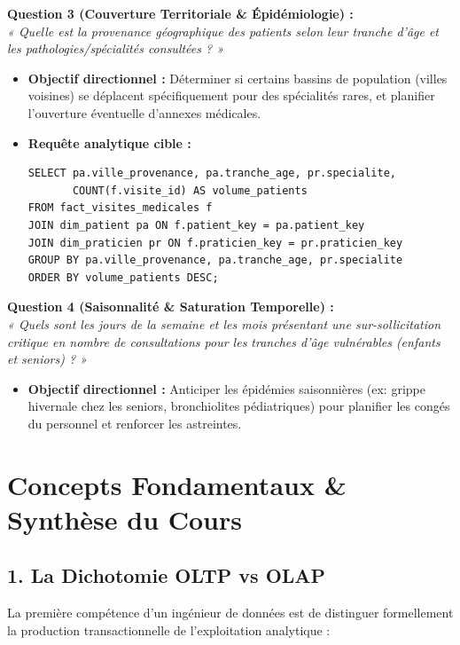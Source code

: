 \documentclass[11pt, a4paper]{article}
\begin{document}
\vspace{0.2cm}
\noindent\textbf{Question 3 (Couverture Territoriale \& Épidémiologie) :} \\
\textit{« Quelle est la provenance géographique des patients selon leur tranche d'âge et les pathologies/spécialités consultées ? »}
\begin{itemize}[label=$\rightarrow$]
    \item \textbf{Objectif directionnel :} Déterminer si certains bassins de population (villes voisines) se déplacent spécifiquement pour des spécialités rares, et planifier l'ouverture éventuelle d'annexes médicales.
    \item \textbf{Requête analytique cible :}
    \begin{lstlisting}
SELECT pa.ville_provenance, pa.tranche_age, pr.specialite,
       COUNT(f.visite_id) AS volume_patients
FROM fact_visites_medicales f
JOIN dim_patient pa ON f.patient_key = pa.patient_key
JOIN dim_praticien pr ON f.praticien_key = pr.praticien_key
GROUP BY pa.ville_provenance, pa.tranche_age, pr.specialite
ORDER BY volume_patients DESC;
    \end{lstlisting}
\end{itemize}

\vspace{0.2cm}
\noindent\textbf{Question 4 (Saisonnalité \& Saturation Temporelle) :} \\
\textit{« Quels sont les jours de la semaine et les mois présentant une sur-sollicitation critique en nombre de consultations pour les tranches d'âge vulnérables (enfants et seniors) ? »}
\begin{itemize}[label=$\rightarrow$]
    \item \textbf{Objectif directionnel :} Anticiper les épidémies saisonnières (ex: grippe hivernale chez les seniors, bronchiolites pédiatriques) pour planifier les congés du personnel et renforcer les astreintes.
\end{itemize}

\newpage

\section{Concepts Fondamentaux \& Synthèse du Cours}

\subsection{1. La Dichotomie OLTP vs OLAP}
La première compétence d'un ingénieur de données est de distinguer formellement la production transactionnelle de l'exploitation analytique :
\end{document}

